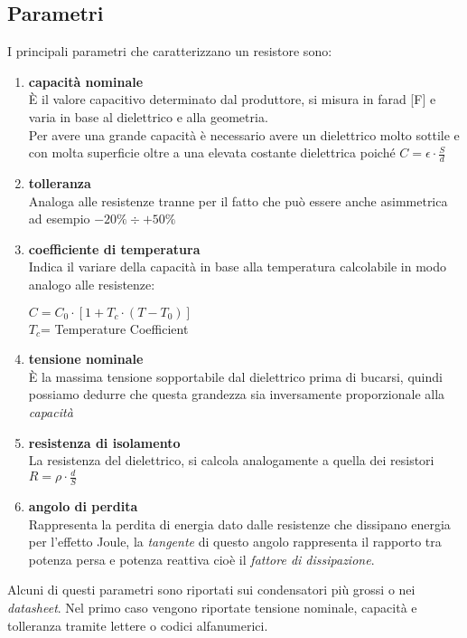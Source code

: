 \documentclass{article}
\begin{document}
\subsection{Parametri}
I principali parametri che caratterizzano un resistore sono:
\begin{enumerate}
    \item \textbf{capacità nominale}\\
    È il valore capacitivo determinato dal produttore, si misura in farad [F] e varia in base al dielettrico e alla geometria.\\
    Per avere una grande capacità è necessario avere un dielettrico molto sottile e con molta superficie oltre a una elevata costante dielettrica poiché $C=\epsilon\cdot\frac{S}{d}$
    \item \textbf{tolleranza}\\
    Analoga alle resistenze tranne per il fatto che può essere anche asimmetrica ad esempio $ -20\%\div+50\%$\\
    \item \textbf{coefficiente di temperatura}\\
    Indica il variare della capacità in base alla temperatura calcolabile in modo analogo alle resistenze:
    \begin{center}
        $C=C_0\cdot[1+T_c\cdot(T-T_0)]$\\
        $T_c$= Temperature Coefficient
    \end{center}

    \item \textbf{tensione nominale }\\
    È la massima tensione sopportabile dal dielettrico prima di bucarsi, quindi possiamo dedurre che questa grandezza sia inversamente proporzionale alla \emph{capacità}
    \item \textbf{resistenza di isolamento}\\
    La resistenza del dielettrico, si calcola analogamente a quella dei resistori $R=\rho\cdot\frac{d}{S}$
    \item \textbf{angolo di perdita}\\
    Rappresenta la perdita di energia dato dalle resistenze che dissipano energia per l'effetto Joule, la \emph{tangente} di questo angolo rappresenta il rapporto tra potenza persa e potenza reattiva cioè il \emph{fattore di dissipazione}.
\end{enumerate}
Alcuni di questi parametri sono riportati sui condensatori più grossi o nei \textit{datasheet}. Nel primo caso vengono riportate tensione nominale, capacità e tolleranza tramite lettere o codici alfanumerici.
\end{document}
